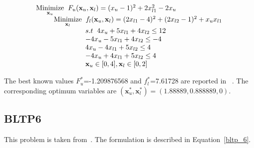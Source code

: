 \begin{equation}
\begin{array}{lr}
\underset{\mathbf{x}_u}{\text{Minimize}}\hspace{2mm} F_u(\mathbf{x}_u, \mathbf{ x}_l)=(x_u-1)^2+2x_{l1}^2-2x_u\\


\hspace{9mm} \underset{\mathbf{x}_l} {\text{Minimize}}\hspace{2mm} f_l(\mathbf{x}_u, \mathbf{ x}_l)=(2x_{l1}-4)^2+(2x_{l2}-1)^2+x_u x_{l1} \\
\hspace{25mm}s.t\hspace{2mm} 4x_u+5x_{l1}+4x_{l2}\leq 12\\
\hspace{25mm}  -4x_u-5x_{l1}+4x_{l2} \leq -4\\
\hspace{25mm}  4x_u-4x_{l1}+5x_{l2} \leq 4\\
\hspace{25mm}  -4x_u+4x_{l1}+5x_{l2} \leq 4\\
\hspace{25mm} \mathbf{x}_u \in {[0,4]},\mathbf{x}_l \in [0,2] \\
\end{array}
\label{bltp_5}
\end{equation}

The best known values $F_u^*$=-1.209876568 and  $f_l^*$=7.61728 are reported in ~\cite{Angelobilevel}. The corresponding optimum variables are $(\mathbf{x}^*_u, \mathbf{x}^*_l)=(1.88889,0.888889,0).$

\subsection{BLTP6}


This problem is taken from~\cite{oduguwa2002bi}. The formulation is described in Equation~\ref{bltp_6}. 

